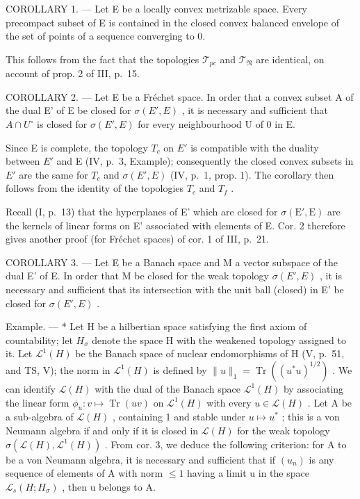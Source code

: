 COROLLARY 1. --- Let E be a locally convex metrizable space. Every precompact subset of E is contained in the closed convex balanced envelope of the set of points of a sequence converging to 0.

This follows from the fact that the topologies \(\mathcal{T}_{pc}\) and \(\mathcal{T}_{\mathfrak{N}}\) are identical, on account of prop. 2 of III, p.~15.

COROLLARY 2. --- Let E be a Fréchet space. In order that a convex subset A of the dual E' of E be closed for \(\sigma(E', E)\) , it is necessary and sufficient that \(A \cap U^{\circ}\) is closed for \(\sigma(E', E)\) for every neighbourhood U of 0 in E.

Since E is complete, the topology \(T_{c}\) on \(E'\) is compatible with the duality between \(E'\) and E (IV, p.~3, Example); consequently the closed convex subsets in \(E'\) are the same for \(T_{c}\) and \(\sigma(E', E)\) (IV, p.~1, prop. 1). The corollary then follows from the identity of the topologies \(T_{c}\) and \(T_{f}\) .

Recall (I, p.~13) that the hyperplanes of E' which are closed for \(\sigma(\mathrm{E}', \mathrm{E})\) are the kernels of linear forms on E' associated with elements of E. Cor. 2 therefore gives another proof (for Fréchet spaces) of cor. 1 of III, p.~21.

COROLLARY 3. --- Let E be a Banach space and M a vector subspace of the dual E' of E. In order that M be closed for the weak topology \(\sigma(E', E)\) , it is necessary and sufficient that its intersection with the unit ball (closed) in E' be closed for \(\sigma(E', E)\) .

Example. --- * Let H be a hilbertian space satisfying the first axiom of countability; let \(H_{\sigma}\) denote the space H with the weakened topology assigned to it. Let \(\mathcal{L}^{1}(H)\) be the Banach space of nuclear endomorphisms of H (V, p.~51, and TS, V); the norm in \(\mathcal{L}^{1}(H)\) is defined by \(\|u\|_{1} = \operatorname{Tr}((u^{*}u)^{1/2})\) . We can identify \(\mathcal{L}(H)\) with the dual of the Banach space \(\mathcal{L}^{1}(H)\) by associating the linear form \(\phi_{u}: v \mapsto \operatorname{Tr}(uv)\) on \(\mathcal{L}^{1}(H)\) with every \(u \in \mathcal{L}(H)\) . Let A be a sub-algebra of \(\mathcal{L}(H)\) , containing 1 and stable under \(u \mapsto u^{*}\) ; this is a von Neumann algebra if and only if it is closed in \(\mathcal{L}(H)\) for the weak topology \(\sigma(\mathcal{L}(H), \mathcal{L}^{1}(H))\) . From cor. 3, we deduce the following criterion: for A to be a von Neumann algebra, it is necessary and sufficient that if \((u_{n})\) is any sequence of elements of A with norm \(\leqslant 1\) having a limit u in the space \(\mathcal{L}_{s}(H; H_{\sigma})\) , then u belongs to A.

